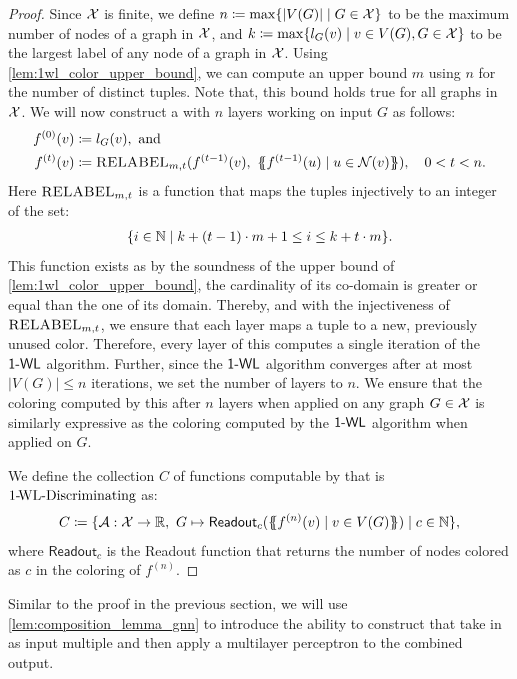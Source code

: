 \begin{proof}
Since $\mathcal{X}$ is finite, we define $n \coloneqq \max \{ |V(G)| \mid G \in \mathcal{X} \}$ to be the maximum number of nodes of a graph in $\mathcal{X}$, and $k \coloneqq \max \{ l_G(v) \mid v \in V(G), G \in \mathcal{X} \}$ to be the largest label of any node of a graph in $\mathcal{X}$. Using \cref{lem:1wl_color_upper_bound}, we can compute an upper bound $m$ using $n$ for the number of distinct tuples. Note that, this bound holds true for all graphs in $\mathcal{X}$. We will now construct a \gnn with $n$ layers working on input $G$ as follows:
\begin{align*}
    f^{(0)}(v) &\coloneqq l_G(v), \ \text{and}\\
    f^{(t)}(v) &\coloneqq \textsc{RELABEL}_{m,t}(f^{(t-1)}(v), \ \MSopen f^{(t-1)}(u) \mid u \in \cN(v)\MSclose), \quad 0 < t < n.
\end{align*}
Here $\textsc{RELABEL}_{m,t}$ is a function that maps the tuples injectively to an integer of the set:
\begin{align*}\{i \in \mathbb{N} \mid k + (t-1)\cdot m +1 \leq i \leq k + t \cdot m\}.
\end{align*}
This function exists as by the soundness of the upper bound of \cref{lem:1wl_color_upper_bound}, the cardinality of its co-domain is greater or equal than the one of its domain. Thereby, and with the injectiveness of $\textsc{RELABEL}_{m,t}$, we ensure that each \gnn layer maps a tuple to a new, previously unused color. Therefore, every layer of this \gnn computes a single iteration of the $\textsf{1-WL}$ algorithm. Further, since the $\textsf{1-WL}$ algorithm converges after at most $|V(G)| \leq n$ iterations, we set the number of layers to $n$. We ensure that the coloring computed by this \gnn after $n$ layers when applied on any graph $G \in \mathcal{X}$ is similarly expressive as the coloring computed by the $\textsf{1-WL}$ algorithm when applied on $G$.

We define the collection $C$ of functions computable by \gnns that is $\text{1-\!WL-Discriminating}$ as: 
\begin{align*}
    C \coloneqq \{ \mathcal{A}: \mathcal{X} \rightarrow \mathbb{R}, \ G \mapsto \textsf{Readout}_c(\{\!\!\{ f^{(n)}(v) \mid v \in V(G) \}\!\!\}) \mid c \in \mathbb{N} \},
\end{align*}
where $\textsf{Readout}_c$ is the \textsf{Readout} function that returns the number of nodes colored as $c$ in the coloring of $f^{(n)}$.
\end{proof}

Similar to the proof in the previous section, we will use \cref{lem:composition_lemma_gnn} to introduce the ability to construct \gnns that take in as input multiple \gnns and then apply a multilayer perceptron to the combined output.


